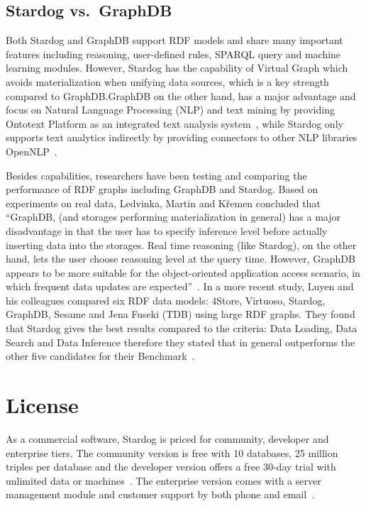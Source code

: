 \subsection{Stardog vs.\ GraphDB}
Both Stardog and GraphDB support RDF models and share many important 
features including reasoning, user-defined rules, SPARQL query and machine 
learning modules. However, Stardog has the capability of Virtual Graph which 
avoids materialization when unifying data sources, which is a key strength 
compared to GraphDB.\@ GraphDB on the other hand, has a major advantage 
and focus on Natural Language Processing (NLP) and text mining by 
providing Ontotext Platform as an integrated text analysis 
system~\cite{hid-sp18-405-www-stardog-ontotext}, while Stardog only 
supports text analytics indirectly by providing connectors to other NLP 
libraries OpenNLP~\cite{hid-sp18-405-www-stardog-docs}. 

Besides capabilities, researchers have been testing and comparing the 
performance of RDF graphs including GraphDB and Stardog. Based on 
experiments on real data, Ledvinka, Martin and K{\v{r}}emen concluded that 
``GraphDB, (and storages performing materialization in general) has a major 
disadvantage in that the user has to specify inference level before actually 
inserting data into the storages. Real time reasoning (like Stardog), on the 
other hand, lets the user choose reasoning level at the query time. However, 
GraphDB appears to be more suitable for the object-oriented application 
access scenario, in which frequent data updates are 
expected''~\cite{hid-sp18-405-ledvinka2015object-stardog}. In a more recent 
study, Luyen and his colleagues compared six RDF data models: 4Store, 
Virtuoso, Stardog, GraphDB, Sesame and Jena Fuseki (TDB) using large RDF 
graphs. They found that Stardog gives the best results compared to the 
criteria: Data Loading, Data Search and Data Inference therefore they stated 
that in general outperforms the other five candidates for their 
Benchmark~\cite{hid-sp18-405-luyen2016development-stardog}.


\section{License}
As a commercial software, Stardog is priced for community, developer and 
enterprise tiers. The community version is free with 10 databases, 25 million 
triples 
per database and the developer version offers a free 30-day trial with 
unlimited data or 
machines~\cite{hid-sp18-405-www-stardog-predictiveanalyticstoday}. The 
enterprise version comes with a server management module and customer 
support by both phone and email~\cite{hid-sp18-405-www-stardog-docs}.


